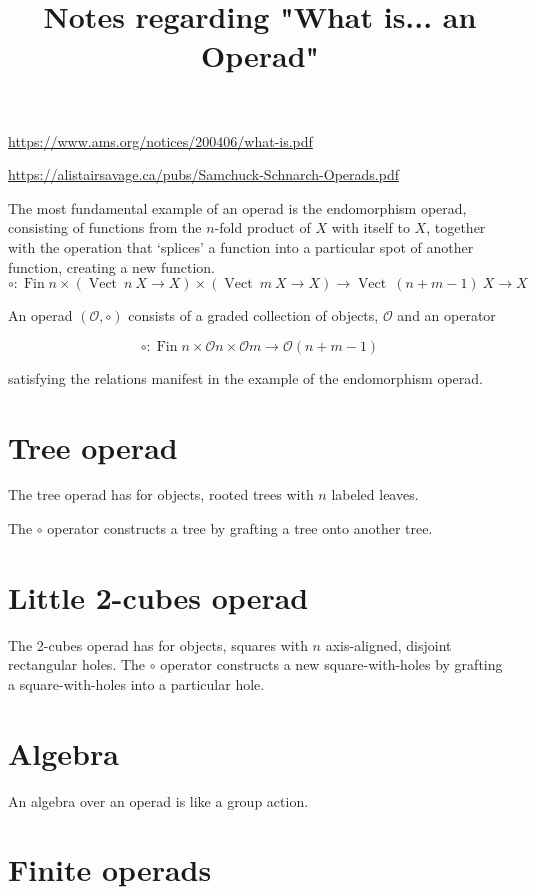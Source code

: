 \documentclass[11pt,noamsfonts]{amsart}
\title{Notes regarding "What is... an Operad"}
\DeclareMathOperator{\Vect}{Vect}
\DeclareMathOperator{\Fin}{Fin}
\begin{document}
\maketitle


\url{https://www.ams.org/notices/200406/what-is.pdf}

\url{https://alistairsavage.ca/pubs/Samchuck-Schnarch-Operads.pdf}

The most fundamental example of an operad is the endomorphism operad, consisting of functions from the \(n\)-fold product of \(X\) with itself to \(X\), together with the operation that `splices' a function into a particular spot of another function,
creating a new function.
\[
\circ : \Fin n \times (\Vect\ n\ X \to X) \times (\Vect\ m\ X \to X) \to \Vect\ (n + m - 1)\ X \to X
\]

An operad \((\mathcal{O}, \circ)\) consists of a graded collection of objects, \(\mathcal{O}\) and an operator 

\[
\circ : \Fin n \times \mathcal{O} n \times \mathcal{O} m \to \mathcal{O} (n + m - 1)
\]

satisfying the relations manifest in the example of the endomorphism operad.

\section{Tree operad}

The tree operad has for objects, rooted trees with \(n\) labeled leaves.

The \(\circ\) operator constructs a tree by grafting a tree onto another tree.

\section{Little 2-cubes operad}

The 2-cubes operad has for objects, squares with \(n\) axis-aligned, disjoint rectangular holes. 
The \(\circ\) operator constructs a new square-with-holes by grafting a square-with-holes into a particular hole.

\section{Algebra}

An algebra over an operad is like a group action.

\section{Finite operads}
\end{document}
